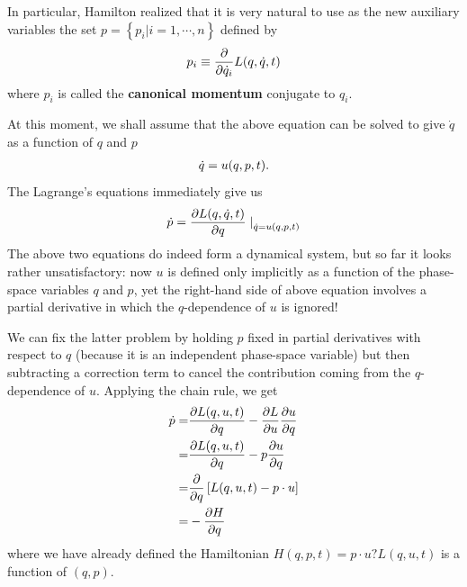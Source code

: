 \documentclass[letterpaper,10pt,english]{sphinxmanual}
\begin{document}
In particular, Hamilton realized that it is very natural to use as the
new auxiliary variables the set \(p=\left\{p_i|i=1,\cdots,n\right\}\) defined by
\begin{gather}
\begin{split}p_i\equiv\frac{\partial}{\partial \dot{q}_i}L(q,\dot{q},t)\end{split}\notag
\end{gather}
where \(p_i\) is called the \textbf{canonical momentum} conjugate
to \(q_i\).

At this moment, we shall assume that the above equation can be solved to give \(\dot{q}\) as a function of \(q\) and \(p\)
\begin{gather}
\begin{split}\dot{q}=u(q,p,t).\end{split}\notag
\end{gather}
The Lagrange's equations immediately give us
\begin{gather}
\begin{split}\dot{p}=\frac{\partial L(q,\dot{q},t)}{\partial q}\left.\right|_{\dot{q}=u(q,p,t)}\end{split}\notag
\end{gather}
The above two equations do indeed form a dynamical system, but so far it looks rather unsatisfactory: now \(u\) is defined only implicitly as a
function of the phase-space variables \(q\) and \(p\), yet the right-hand side of above equation involves a partial derivative in which the \(q\)-dependence of
\(u\) is ignored!

We can fix the latter problem by holding \(p\) fixed in partial derivatives
with respect to \(q\) (because it is an independent phase-space variable) but then subtracting a correction term to cancel the contribution coming from the \(q\)-dependence of \(u\). Applying the chain rule, we get
\begin{gather}
\begin{split}\dot{p}=&\frac{\partial L(q,u,t)}{\partial q}-\frac{\partial L}{\partial u}\frac{\partial u}{\partial q} \\
=&\frac{\partial L(q,u,t)}{\partial q}-p\frac{\partial u}{\partial q} \\
=&\frac{\partial}{\partial q}\left[L(q,u,t)-p\cdot u\right] \\
=&-\frac{\partial H}{\partial q}\end{split}\notag
\end{gather}
where we have already defined the Hamiltonian \(H(q, p, t)= p\cdot u ? L(q,u, t)\) is a function of \((q, p)\).
\end{document}
